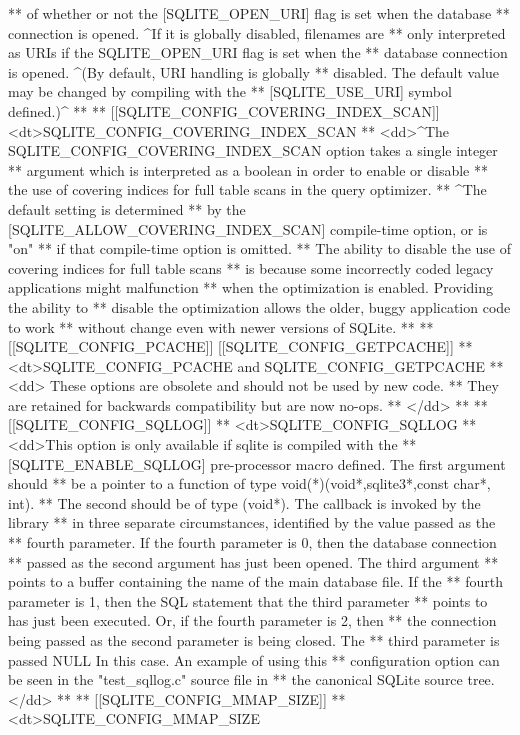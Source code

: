 \begin{Codex}[label=sqlite3.h,numbers=left]
{** of whether or not the [SQLITE_OPEN_URI] flag is set when the database
** connection is opened. ^If it is globally disabled, filenames are
** only interpreted as URIs if the SQLITE_OPEN_URI flag is set when the
** database connection is opened. ^(By default, URI handling is globally
** disabled. The default value may be changed by compiling with the
** [SQLITE_USE_URI] symbol defined.)^
**
** [[SQLITE_CONFIG_COVERING_INDEX_SCAN]] <dt>SQLITE_CONFIG_COVERING_INDEX_SCAN
** <dd>^The SQLITE_CONFIG_COVERING_INDEX_SCAN option takes a single integer
** argument which is interpreted as a boolean in order to enable or disable
** the use of covering indices for full table scans in the query optimizer.
** ^The default setting is determined
** by the [SQLITE_ALLOW_COVERING_INDEX_SCAN] compile-time option, or is "on"
** if that compile-time option is omitted.
** The ability to disable the use of covering indices for full table scans
** is because some incorrectly coded legacy applications might malfunction
** when the optimization is enabled.  Providing the ability to
** disable the optimization allows the older, buggy application code to work
** without change even with newer versions of SQLite.
**
** [[SQLITE_CONFIG_PCACHE]] [[SQLITE_CONFIG_GETPCACHE]]
** <dt>SQLITE_CONFIG_PCACHE and SQLITE_CONFIG_GETPCACHE
** <dd> These options are obsolete and should not be used by new code.
** They are retained for backwards compatibility but are now no-ops.
** </dd>
**
** [[SQLITE_CONFIG_SQLLOG]]
** <dt>SQLITE_CONFIG_SQLLOG
** <dd>This option is only available if sqlite is compiled with the
** [SQLITE_ENABLE_SQLLOG] pre-processor macro defined. The first argument should
** be a pointer to a function of type void(*)(void*,sqlite3*,const char*, int).
** The second should be of type (void*). The callback is invoked by the library
** in three separate circumstances, identified by the value passed as the
** fourth parameter. If the fourth parameter is 0, then the database connection
** passed as the second argument has just been opened. The third argument
** points to a buffer containing the name of the main database file. If the
** fourth parameter is 1, then the SQL statement that the third parameter
** points to has just been executed. Or, if the fourth parameter is 2, then
** the connection being passed as the second parameter is being closed. The
** third parameter is passed NULL In this case.  An example of using this
** configuration option can be seen in the "test_sqllog.c" source file in
** the canonical SQLite source tree.</dd>
**
** [[SQLITE_CONFIG_MMAP_SIZE]]
** <dt>SQLITE_CONFIG_MMAP_SIZE
}
\end{Codex}
